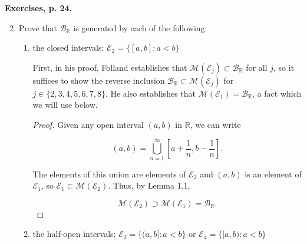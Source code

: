 \documentclass[11pt,oneside,english]{amsart}
\theoremstyle{definition}
\newcommand{\R}{\mathbb{R}}
\newcommand{\MC}[1]{\mathcal{#1}}
\begin{document}
\rightline{\today}


\textbf{Exercises, p. 24.}

\vspace{1cm}
\begin{enumerate}
\setcounter{enumi}{1}
\item Prove that $\mathcal{B}_{\R}$ is generated by each of the following:

\begin{enumerate}
\itemsep6mm
\setcounter{enumii}{1}
\item the closed intervals: $\mathcal{E}_2=\{[a,b]:a<b\}$

First, in his proof, Folland establishes that $\MC{M}(\MC{E}_j)\subset\MC{B}_{\R}$ for all $j$, so it suffices to show the reverse inclusion $\MC{B}_{\R}\subset\MC{M}(\MC{E}_j)$ for $j\in\{2,3,4,5,6,7,8\}$. He also establishes that $\MC{M}(\MC{E}_1)=\MC{B}_\R$, a fact which we will use below.

\begin{proof}

Given any open interval $(a,b)$ in $\R$, we can write

\[
(a,b)=\bigcup_{n=1}^\infty\left[a+\frac{1}{n},b-\frac{1}{n}\right].
\]

The elements of this union are elements of $\MC{E}_2$ and $(a,b)$ is an element of $\MC{E}_1$, so $\MC{E}_1\subset\MC{M}(\MC{E}_2)$. Thus, by Lemma 1.1,

\[
\MC{M}(\MC{E}_2)\supset\MC{M}(\MC{E}_1)=\MC{B}_\R.
\]


%
%
%
%
\end{proof}

\pagebreak

\item the half-open intervals: $\MC{E}_3=\{(a,b]:a<b\}$ or $\MC{E}_4=\{[a,b):a<b\}$


\end{enumerate}
\end{enumerate}
\end{document}
